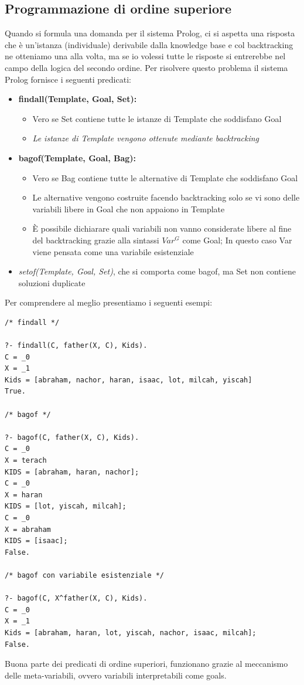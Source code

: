 \documentclass[a4paper]{book}
\begin{document}
\subsection{Programmazione di ordine superiore}
Quando si formula una domanda per il sistema Prolog, ci si aspetta una risposta che è un'istanza (individuale) derivabile dalla knowledge base
e col backtracking ne otteniamo una alla volta, ma se io volessi tutte le risposte si entrerebbe nel campo della logica del secondo ordine.\newline
Per risolvere questo problema il sistema Prolog fornisce i seguenti predicati:
\begin{itemize}
\item \textbf{findall(Template, Goal, Set):}
\begin{itemize}
\item Vero se Set contiene tutte le istanze di Template che soddisfano Goal
\item \textit{Le istanze di Template vengono ottenute mediante backtracking}
\end{itemize}
\item \textbf{bagof(Template, Goal, Bag):}
\begin{itemize}
\item Vero se Bag contiene tutte le alternative di Template che soddisfano Goal
\item Le alternative vengono costruite facendo backtracking solo se vi sono delle variabili libere in Goal che non appaiono in Template
\item È possibile dichiarare quali variabili non vanno considerate libere al fine del backtracking grazie alla sintassi $Var^G$ come Goal;
  In questo caso Var viene pensata come una variabile esistenziale
\end{itemize}
\item \textit{setof(Template, Goal, Set)}, che si comporta come bagof, ma Set non contiene soluzioni duplicate
\end{itemize}
Per comprendere al meglio presentiamo i seguenti esempi:
\begin{verbatim}
/* findall */

?- findall(C, father(X, C), Kids).
C = _0
X = _1
Kids = [abraham, nachor, haran, isaac, lot, milcah, yiscah]
True.

/* bagof */

?- bagof(C, father(X, C), Kids).
C = _0
X = terach
KIDS = [abraham, haran, nachor];
C = _0
X = haran
KIDS = [lot, yiscah, milcah];
C = _0
X = abraham
KIDS = [isaac];
False.

/* bagof con variabile esistenziale */

?- bagof(C, X^father(X, C), Kids).
C = _0
X = _1
Kids = [abraham, haran, lot, yiscah, nachor, isaac, milcah];
False.
\end{verbatim}
Buona parte dei predicati di ordine superiori, funzionano grazie al meccanismo delle meta-variabili, ovvero variabili interpretabili come goals.
\end{document}
